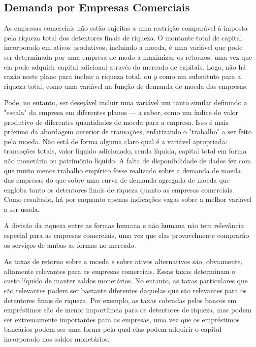 \documentclass[12pt]{article}
\begin{document}
\subsection{Demanda por Empresas Comerciais}

As empresas comerciais não estão sujeitas a uma restrição comparável à imposta pela riqueza total dos detentores finais de riqueza. O montante total de capital incorporado em ativos produtivos, incluindo a moeda, é uma variável que pode ser determinada por uma empresa de modo a maximizar os retornos, uma vez que ela pode adquirir capital adicional através do mercado de capitais. Logo, não há razão neste plano para incluir a riqueza total, ou $y$ como um substituto para a riqueza total, como uma variável na função de demanda de moeda das empresas.

Pode, no entanto, ser desejável incluir uma variável um tanto similar definindo a "escala" da empresa em diferentes planos — a saber, como um índice do valor produtivo de diferentes quantidades de moeda para a empresa. Isso é mais próximo da abordagem anterior de transações, enfatizando o "trabalho" a ser feito pela moeda. Não está de forma alguma claro qual é a variável apropriada: transações totais, valor líquido adicionado, renda líquida, capital total em forma não monetária ou patrimônio líquido. A falta de disponibilidade de dados fez com que muito menos trabalho empírico fosse realizado sobre a demanda de moeda das empresas do que sobre uma curva de demanda agregada de moeda que engloba tanto os detentores finais de riqueza quanto as empresas comerciais. Como resultado, há por enquanto apenas indicações vagas sobre a melhor variável a ser usada.

A divisão da riqueza entre as formas humana e não humana não tem relevância especial para as empresas comerciais, uma vez que elas provavelmente comprarão os serviços de ambas as formas no mercado.

As taxas de retorno sobre a moeda e sobre ativos alternativos são, obviamente, altamente relevantes para as empresas comerciais. Essas taxas determinam o custo líquido de manter saldos monetários. No entanto, as taxas particulares que são relevantes podem ser bastante diferentes daquelas que são relevantes para os detentores finais de riqueza. Por exemplo, as taxas cobradas pelos bancos em empréstimos são de menor importância para os detentores de riqueza, mas podem ser extremamente importantes para as empresas, uma vez que os empréstimos bancários podem ser uma forma pela qual elas podem adquirir o capital incorporado nos saldos monetários.
\end{document}
